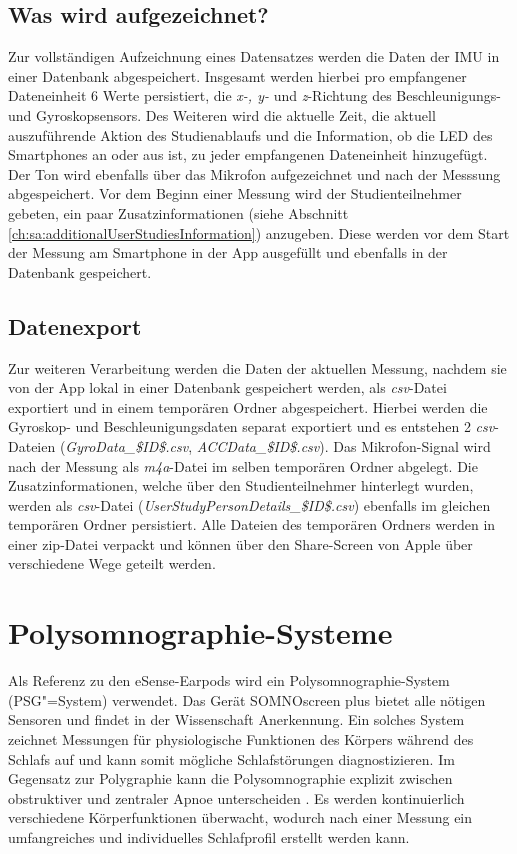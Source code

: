 \subsection{Was wird aufgezeichnet?}
\label{ch:sa:ep:what_to_record}
Zur vollständigen Aufzeichnung eines Datensatzes werden die Daten der IMU in einer Datenbank abgespeichert.
Insgesamt werden hierbei pro empfangener Dateneinheit 6 Werte persistiert, die \textit{x-, y-} und \textit{z}-Richtung des Beschleunigungs- und Gyroskopsensors. 
Des Weiteren wird die aktuelle Zeit, die aktuell auszuführende Aktion des Studienablaufs und die Information, ob die LED des Smartphones an oder aus ist, zu jeder empfangenen Dateneinheit hinzugefügt.
Der Ton wird ebenfalls über das Mikrofon aufgezeichnet und nach der Messsung abgespeichert.
Vor dem Beginn einer Messung wird der Studienteilnehmer gebeten, ein paar Zusatzinformationen (siehe Abschnitt \ref{ch:sa:additionalUserStudiesInformation}) anzugeben.
Diese werden vor dem Start der Messung am Smartphone in der App ausgefüllt und ebenfalls in der Datenbank gespeichert.

\subsection{Datenexport}
\label{ch:sa:ep:export}
Zur weiteren Verarbeitung werden die Daten der aktuellen Messung, nachdem sie von der App lokal in einer Datenbank gespeichert werden, als \textit{csv}-Datei exportiert und in einem temporären Ordner abgespeichert.
Hierbei werden die Gyroskop- und Beschleunigungsdaten separat exportiert und es entstehen 2 \textit{csv}-Dateien \newline (\glqq \textit{GyroData\_\$ID\$.csv}\grqq, \glqq \textit{ACCData\_\$ID\$.csv}\grqq).
Das Mikrofon-Signal wird nach der Messung als \textit{m4a}-Datei im selben temporären Ordner abgelegt.
Die Zusatzinformationen, welche über den Studienteilnehmer hinterlegt wurden, werden als \textit{csv}-Datei (\glqq \textit{UserStudyPersonDetails\_\$ID\$.csv}\grqq) ebenfalls im gleichen temporären Ordner persistiert.
Alle Dateien des temporären Ordners werden in einer zip-Datei verpackt und können über den Share-Screen von Apple über verschiedene Wege geteilt werden.

\section{Polysomnographie-Systeme}
\label{ch:sa:psg}
Als Referenz zu den eSense-Earpods wird ein Polysomnographie-System (PSG"=System) verwendet. 
Das Gerät SOMNOscreen{\texttrademark} plus bietet alle nötigen Sensoren und findet in der Wissenschaft Anerkennung.
Ein solches System zeichnet Messungen für physiologische Funktionen des Körpers während des Schlafs auf und kann somit mögliche Schlafstörungen diagnostizieren.
Im Gegensatz zur Polygraphie kann die Polysomnographie explizit zwischen obstruktiver und zentraler Apnoe unterscheiden \cite{croenleinSchlafmedizin1x1Praxisorientiertes2017}.
Es werden kontinuierlich verschiedene Körperfunktionen überwacht, wodurch nach einer Messung ein umfangreiches und individuelles Schlafprofil erstellt werden kann.


